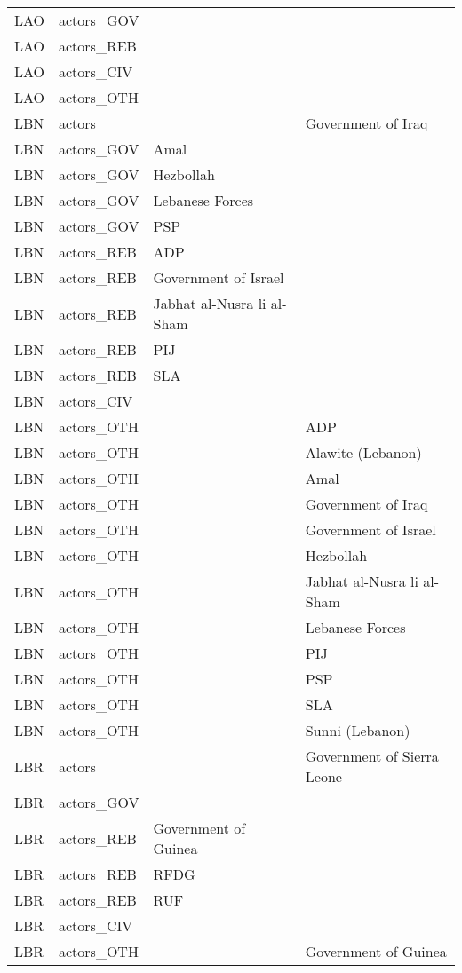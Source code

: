 \begin{table}[ht]
\begin{tabular}{llll}
  LAO & actors\_GOV &  &  \\ 
  LAO & actors\_REB &  &  \\ 
  LAO & actors\_CIV &  &  \\ 
  LAO & actors\_OTH &  &  \\ 
  LBN & actors &  & Government of Iraq \\ 
  LBN & actors\_GOV & Amal &  \\ 
  LBN & actors\_GOV & Hezbollah &  \\ 
  LBN & actors\_GOV & Lebanese Forces &  \\ 
  LBN & actors\_GOV & PSP &  \\ 
  LBN & actors\_REB & ADP &  \\ 
  LBN & actors\_REB & Government of Israel &  \\ 
  LBN & actors\_REB & Jabhat al-Nusra li al-Sham &  \\ 
  LBN & actors\_REB & PIJ &  \\ 
  LBN & actors\_REB & SLA &  \\ 
  LBN & actors\_CIV &  &  \\ 
  LBN & actors\_OTH &  & ADP \\ 
  LBN & actors\_OTH &  & Alawite (Lebanon) \\ 
  LBN & actors\_OTH &  & Amal \\ 
  LBN & actors\_OTH &  & Government of Iraq \\ 
  LBN & actors\_OTH &  & Government of Israel \\ 
  LBN & actors\_OTH &  & Hezbollah \\ 
  LBN & actors\_OTH &  & Jabhat al-Nusra li al-Sham \\ 
  LBN & actors\_OTH &  & Lebanese Forces \\ 
  LBN & actors\_OTH &  & PIJ \\ 
  LBN & actors\_OTH &  & PSP \\ 
  LBN & actors\_OTH &  & SLA \\ 
  LBN & actors\_OTH &  & Sunni (Lebanon) \\ 
  LBR & actors &  & Government of Sierra Leone \\ 
  LBR & actors\_GOV &  &  \\ 
  LBR & actors\_REB & Government of Guinea &  \\ 
  LBR & actors\_REB & RFDG &  \\ 
  LBR & actors\_REB & RUF &  \\ 
  LBR & actors\_CIV &  &  \\ 
  LBR & actors\_OTH &  & Government of Guinea \\ 

\end{tabular}
\end{table}
